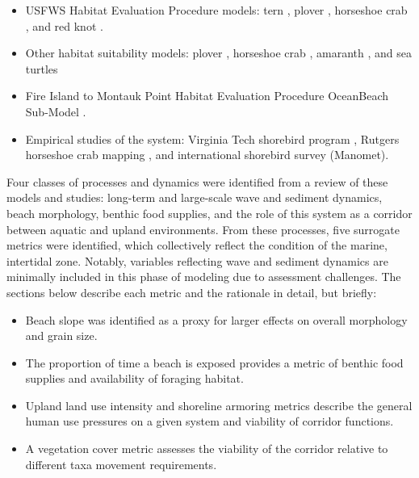 \documentclass[
]{book}
\providecommand{\tightlist}{%
  \setlength{\itemsep}{0pt}\setlength{\parskip}{0pt}}
\begin{document}
\begin{itemize}
\tightlist
\item
  USFWS Habitat Evaluation Procedure models: tern \citep[\citet{us_fish_and_wildlife_service_usfws_gulf_2001}]{carreker_habitat_1985}, plover \citep{us_fish_and_wildlife_service_usfws_gulf_2001}, horseshoe crab \citep{us_fish_and_wildlife_service_usfws_gulf_2001}, and red knot \citep{us_fish_and_wildlife_service_usfws_gulf_2001}.
\item
  Other habitat suitability models: plover \citep[\citet{seavey_effect_2011}]{farmer_habitat_2000}, horseshoe crab \citep[\citet{nancy_jackson_armoring_2010}, \citet{lathrope_mapping_2013}]{avissar_modeling_2006}, amaranth \citep{sellars_habitat_2007}, and sea turtles \citep{dunkin_spatially_2016}\\
\item
  Fire Island to Montauk Point Habitat Evaluation Procedure OceanBeach Sub-Model \citep{usace_evaluation_2009}.\\
\item
  Empirical studies of the system: Virginia Tech shorebird program \citep{herman_unpacking_2019}, Rutgers horseshoe crab mapping \citep{lathrope_mapping_2013}, and international shorebird survey (Manomet).
\end{itemize}

Four classes of processes and dynamics were identified from a review of these models and studies: long-term and large-scale wave and sediment dynamics, beach morphology, benthic food supplies, and the role of this system as a corridor between aquatic and upland environments. From these processes, five surrogate metrics were identified, which collectively reflect the condition of the marine, intertidal zone. Notably, variables reflecting wave and sediment dynamics are minimally included in this phase of modeling due to assessment challenges. The sections below describe each metric and the rationale in detail, but briefly:

\begin{itemize}
\item
  Beach slope was identified as a proxy for larger effects on overall morphology and grain size.
\item
  The proportion of time a beach is exposed provides a metric of benthic food supplies and availability of foraging habitat.
\item
  Upland land use intensity and shoreline armoring metrics describe the general human use pressures on a given system and viability of corridor functions.
\item
  A vegetation cover metric assesses the viability of the corridor relative to different taxa movement requirements.
\end{itemize}
\end{document}
